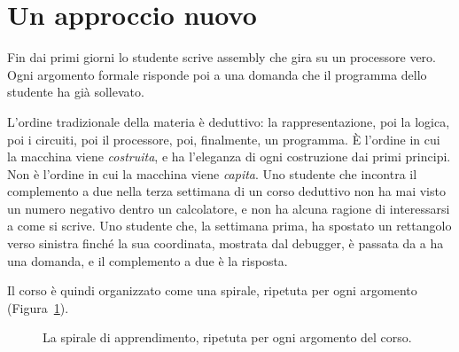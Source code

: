\section{Un approccio nuovo}

\begin{prgconcept}
Fin dai primi giorni lo studente scrive assembly \riscv che gira su un
processore vero. Ogni argomento formale risponde poi a una domanda che il
programma dello studente ha già sollevato.
\end{prgconcept}

L'ordine tradizionale della materia è deduttivo: la rappresentazione, poi la
logica, poi i circuiti, poi il processore, poi, finalmente, un programma. È
l'ordine in cui la macchina viene \emph{costruita}, e ha l'eleganza di ogni
costruzione dai primi principi. Non è l'ordine in cui la macchina viene
\emph{capita}. Uno studente che incontra il complemento a due nella terza
settimana di un corso deduttivo non ha mai visto un numero negativo dentro un
calcolatore, e non ha alcuna ragione di interessarsi a come si scrive. Uno
studente che, la settimana prima, ha spostato un rettangolo verso sinistra
finché la sua coordinata, mostrata dal debugger, è passata da  a
 ha una domanda, e il complemento a due è la risposta.

Il corso è quindi organizzato come una spirale, ripetuta per ogni argomento
(Figura~\ref{fig:intro:spiral}).

\begin{figure}[htb]
\centering
{}
\caption{La spirale di apprendimento, ripetuta per ogni argomento del corso.}
\label{fig:intro:spiral}
\end{figure}

